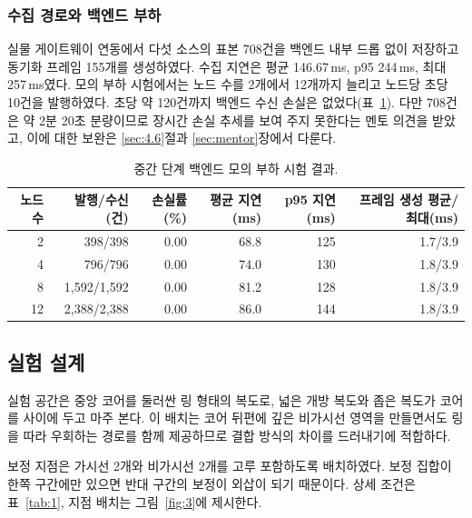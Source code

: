 \documentclass[11pt,a4paper]{article}
\begin{document}
\subsubsection{수집 경로와 백엔드 부하}

실물 게이트웨이 연동에서 다섯 소스의 표본 708건을 백엔드 내부 드롭 없이 저장하고 동기화 프레임 155개를 생성하였다.
수집 지연은 평균 146.67\,ms, p95 244\,ms, 최대 257\,ms였다. 모의 부하 시험에서는 노드 수를 2개에서 12개까지 늘리고
노드당 초당 10건을 발행하였다. 초당 약 120건까지 백엔드 수신 손실은 없었다(표~\ref{tab:pilot-load}). 다만 708건은 약
2분 20초 분량이므로 장시간 손실 추세를 보여 주지 못한다는 멘토 의견을 받았고, 이에 대한 보완은 \ref{sec:4.6}절과
\ref{sec:mentor}장에서 다룬다.

\begin{table}[htbp]
  \centering\small
  \caption{중간 단계 백엔드 모의 부하 시험 결과.}
  \label{tab:pilot-load}
  \begin{tabular}{@{}rrrrrr@{}}
    \toprule
    노드 수 & 발행/수신(건) & 손실률(\%) & 평균 지연(ms) & p95 지연(ms) & 프레임 생성 평균/최대(ms) \\
    \midrule
    2  & 398/398     & 0.00 & 68.8 & 125 & 1.7/3.9 \\
    4  & 796/796     & 0.00 & 74.0 & 130 & 1.8/3.9 \\
    8  & 1,592/1,592 & 0.00 & 81.2 & 128 & 1.8/3.9 \\
    12 & 2,388/2,388 & 0.00 & 86.0 & 144 & 1.8/3.9 \\
    \bottomrule
  \end{tabular}
\end{table}

\subsection{실험 설계}
\label{sec:4.1}

실험 공간은 중앙 코어를 둘러싼 링 형태의 복도로, 넓은 개방 복도와 좁은 복도가 코어를 사이에 두고 마주 본다. 이 배치는 코어 뒤편에 깊은 비가시선 영역을 만들면서도 링을 따라
우회하는 경로를 함께 제공하므로 결합 방식의 차이를 드러내기에 적합하다.

보정 지점은 가시선 2개와 비가시선 2개를 고루 포함하도록 배치하였다. 보정 집합이 한쪽 구간에만 있으면 반대 구간의 보정이 외삽이 되기 때문이다. 상세 조건은
표~\ref{tab:1}, 지점 배치는 그림~\ref{fig:3}에 제시한다.
\end{document}

